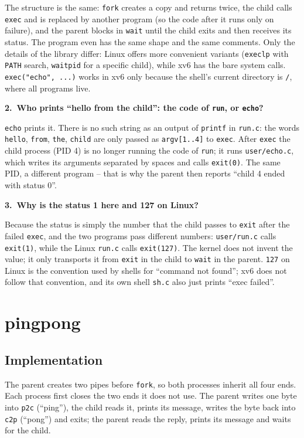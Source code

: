 \documentclass[12pt,a4paper]{article}
\newcommand{\qa}[2]{%
  \par\needspace{5\baselineskip}\medskip
  \noindent\textbf{#1.~#2}\par\smallskip\noindent}
\begin{document}
The structure is the same: \texttt{fork} creates a copy and returns twice, the child calls \texttt{exec} and is replaced by another program (so the code after it runs only on failure), and the parent blocks in \texttt{wait} until the child exits and then receives its status. The program even has the same shape and the same comments. Only the details of the library differ: Linux offers more convenient variants (\texttt{execlp} with \texttt{PATH} search, \texttt{waitpid} for a specific child), while xv6 has the bare system calls. \texttt{exec("echo", ...)} works in xv6 only because the shell's current directory is \texttt{/}, where all programs live.

\qa{2}{Who prints ``hello from the child'': the code of \texttt{run}, or \texttt{echo}?}
\texttt{echo} prints it. There is no such string as an output of \texttt{printf} in \texttt{run.c}: the words \texttt{hello}, \texttt{from}, \texttt{the}, \texttt{child} are only passed as \texttt{argv[1..4]} to \texttt{exec}. After \texttt{exec} the child process (PID 4) is no longer running the code of \texttt{run}; it runs \texttt{user/echo.c}, which writes its arguments separated by spaces and calls \texttt{exit(0)}. The same PID, a different program -- that is why the parent then reports ``child 4 ended with status 0''.

\qa{3}{Why is the status 1 here and 127 on Linux?}
Because the status is simply the number that the child passes to \texttt{exit} after the failed \texttt{exec}, and the two programs pass different numbers: \texttt{user/run.c} calls \texttt{exit(1)}, while the Linux \texttt{run.c} calls \texttt{exit(127)}. The kernel does not invent the value; it only transports it from \texttt{exit} in the child to \texttt{wait} in the parent. \texttt{127} on Linux is the convention used by shells for ``command not found''; xv6 does not follow that convention, and its own shell \texttt{sh.c} also just prints ``exec failed''.

\newpage
\section{pingpong}

\subsection{Implementation}

The parent creates two pipes before \texttt{fork}, so both processes inherit all four ends. Each process first closes the two ends it does not use. The parent writes one byte into \texttt{p2c} (``ping''), the child reads it, prints its message, writes the byte back into \texttt{c2p} (``pong'') and exits; the parent reads the reply, prints its message and waits for the child.
\end{document}
